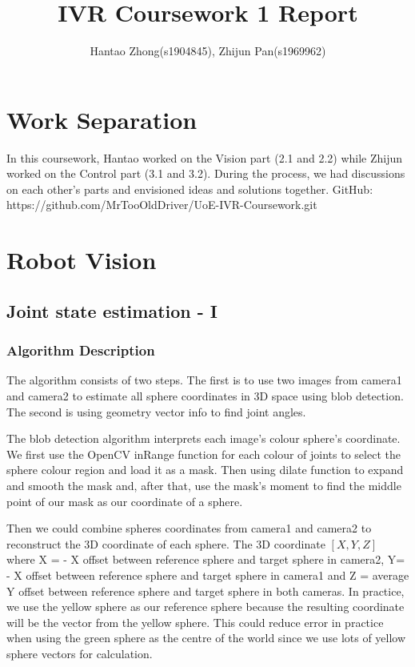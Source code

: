 \documentclass[11pt]{article}
\title{IVR Coursework 1 Report}
\author{Hantao Zhong(s1904845), Zhijun Pan(s1969962)}
\begin{document}
\singlespacing  %

\maketitle

\section{Work Separation}

In this coursework, Hantao worked on the Vision part (2.1 and 2.2) while Zhijun worked on the Control part (3.1 and 3.2). During the process, we had discussions on each other's parts and envisioned ideas and solutions together. GitHub: https://github.com/MrTooOldDriver/UoE-IVR-Coursework.git

\section{Robot Vision}

\subsection{Joint state estimation - I}

\subsubsection{Algorithm Description}

The algorithm consists of two steps. The first is to use two images from camera1 and camera2 to estimate all sphere coordinates in 3D space using blob detection. The second is using geometry vector info to find joint angles.

The blob detection algorithm interprets each image's colour sphere's coordinate. We first use the OpenCV inRange function for each colour of joints to select the sphere colour region and load it as a mask. Then using dilate function to expand and smooth the mask and, after that, use the mask's moment to find the middle point of our mask as our coordinate of a sphere.

Then we could combine spheres coordinates from camera1 and camera2 to reconstruct the 3D coordinate of each sphere. The 3D coordinate $[X,Y,Z]$ where X = - X offset between reference sphere and target sphere in camera2,  Y= - X offset between reference sphere and target sphere in camera1 and Z = average Y offset between reference sphere and target sphere in both cameras. In practice, we use the yellow sphere as our reference sphere because the resulting coordinate will be the vector from the yellow sphere. This could reduce error in practice when using the green sphere as the centre of the world since we use lots of yellow sphere vectors for calculation.
\end{document}
